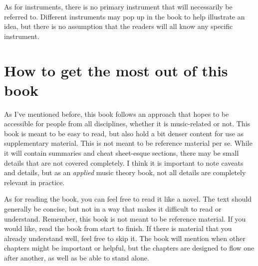 \documentclass[../OpenAppliedMusicTheory.tex]{subfiles}
\begin{document}
    As for instruments, there is no primary instrument that will necessarily be referred to. Different instruments may pop up in the book to help illustrate an idea, but there is no assumption that the readers will all know any specific instrument.

    \section*{How to get the most out of this book}
    As I've mentioned before, this book follows an approach that hopes to be accessible for people from all disciplines, whether it is music-related or not. This book is meant to be easy to read, but also hold a bit denser content for use as supplementary material. This is not meant to be reference material per se. While it will contain summaries and cheat sheet-esque sections, there may be small details that are not covered completely. I think it is important to note caveats and details, but as an \emph{applied} music theory book, not all details are completely relevant in practice. 

    As for reading the book, you can feel free to read it like a novel. The text should generally be concise, but not in a way that makes it difficult to read or understand. Remember, this book is not meant to be reference material. If you would like, read the book from start to finish. If there is material that you already understand well, feel free to skip it. The book will mention when other chapters might be important or helpful, but the chapters are designed to flow one after another, as well as be able to stand alone.

\end{document}
